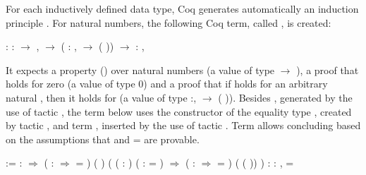For each inductively defined data type,
Coq generates automatically an induction principle \cite[Chapter
  14]{Bertot2010}. For natural numbers, the following Coq term, called
, is created: 
\begin{coqdoccode}
\coqdocemptyline
\coqdocnoindent
{}\coqdoceol
\coqdocindent{2.50em}
: \coqdockw{\ensuremath{\forall}}  :  \ensuremath{\rightarrow} ,\coqdoceol
\coqdocindent{3.50em}
  \ensuremath{\rightarrow} (\coqdockw{\ensuremath{\forall}}  : ,   \ensuremath{\rightarrow}  ( )) \ensuremath{\rightarrow}\coqdoceol
\coqdocindent{3.50em}
\coqdockw{\ensuremath{\forall}}  : ,  \coqdoceol
\coqdocnoindent
\end{coqdoccode}
It expects a property () over natural numbers (a value of type
 \ensuremath{\rightarrow} ), a proof that  holds for zero (a value of
type  0) and a proof that if  holds for an arbitrary
natural , then it holds for   (a value of type
\coqdockw{\ensuremath{\forall}} :,   \ensuremath{\rightarrow}  ( )). Besides , generated by
the use of tactic , the term below 
uses the constructor of the equality
type , created by tactic , and term
, inserted by the use of tactic . Term
 allows concluding   based on the assumptions
that   and  =  are provable.
 \begin{coqdoccode}
\coqdocindent{9.00em}
\coqdoceol
\coqdocnoindent
{} :=\coqdoceol
\coqdocindent{4.00em}
  :  \ensuremath{\Rightarrow}\coqdoceol
\coqdocindent{8.00em}
\coqdoceol
\coqdocindent{8.00em}
(  :  \ensuremath{\Rightarrow}    = ) ( )\coqdoceol
\coqdocindent{9.00em}
( ( : ) ( :    = ) \ensuremath{\Rightarrow}\coqdoceol
\coqdocindent{9.50em}
 (  :  \ensuremath{\Rightarrow}   =  )\coqdoceol
\coqdocindent{10.50em}
( ( )) ) \coqdoceol
\coqdocindent{8.00em}
: \coqdockw{\ensuremath{\forall}}  : ,    = \coqdoceol
\coqdocindent{20.50em}
\coqdoceol
\coqdocnoindent
\end{coqdoccode}

